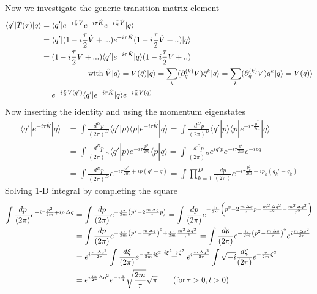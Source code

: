 \documentclass[10pt,a4paper]{article}
\theoremstyle{definition}
\begin{document}
Now we investigate the generic transition matrix element
\begin{align}
\langle q'|\hat{T}(\tau)|q\rangle
&=\langle q'|e^{-i\frac{\tau}{2}\hat{V}}e^{-i\tau\hat{K}}e^{-i\frac{\tau}{2}\hat{V}}|q\rangle\\
&=\langle q'|(1-i\frac{\tau}{2}\hat{V}+...)e^{-i\tau\hat{K}}(1-i\frac{\tau}{2}\hat{V}+..)|q\rangle\\
&=(1-i\frac{\tau}{2}V+...)\langle q'|e^{-i\tau\hat{K}}|q\rangle(1-i\frac{\tau}{2}V+..)\\
&\qquad\qquad\qquad\text{with\;} \hat{V}|q\rangle =V(\hat{q})|q\rangle=\sum_k(\partial_q^{(k)}V)\hat{q}^{k}|q\rangle=\sum_k(\partial_q^{(k)}V)q^{k}|q\rangle=V(q)\rangle\\
&=e^{-i\frac{\tau}{2}V(q')}\langle q'|e^{-i\tau\hat{K}}|q\rangle e^{-i\frac{\tau}{2}V(q)}
\end{align}
Now inserting the identity and using the momentum eigenstates
\begin{align}
\langle q'|e^{-i\tau\hat{K}}|q\rangle
&=\int \frac{d^Dp}{(2\pi)^D}\langle q'|p\rangle\langle p|e^{-i\tau\hat{K}}|q\rangle
=\int \frac{d^Dp}{(2\pi)^D}\langle q'|p\rangle\langle p|e^{-i\tau\frac{\hat{p}^2}{2m}}|q\rangle\\
&=\int \frac{d^Dp}{(2\pi)^D}\langle q'|p\rangle e^{-i\tau\frac{p^2}{2m}}\langle p|q\rangle
=\int \frac{d^Dp}{(2\pi)^D}e^{iq'p} e^{-i\tau\frac{p^2}{2m}}e^{-ipq}\\
&=\int \frac{d^Dp}{(2\pi)^D}e^{-i\tau\frac{p^2}{2m}+ip(q'-q)}
=\int \prod_{k=1}^D\frac{dp}{(2\pi)}e^{-i\tau\frac{p_k^2}{2m}+ip_k(q_k'-q_k)}
\end{align}
Solving 1-D integral by completing the square
\begin{align}
\int \frac{dp}{(2\pi)}e^{-i\tau\frac{p^2}{2m}+ip\,\Delta q}
&=\int \frac{dp}{(2\pi)}e^{-\frac{i\tau}{2m}\left(p^2-2\frac{m\,\Delta q}{\tau}p\right)}
=\int \frac{dp}{(2\pi)}e^{-\frac{i\tau}{2m}\left(p^2-2\frac{m\,\Delta q}{\tau}p+\frac{m^2\,\Delta q^2}{\tau^2}-\frac{m^2\,\Delta q^2}{\tau^2}\right)}\\
&=\int \frac{dp}{(2\pi)}e^{-\frac{i\tau}{2m}\left(p^2-\frac{m\,\Delta q}{\tau}\right)^2+\frac{i\tau}{2m}\frac{m^2\,\Delta q^2}{\tau^2}}
=\int \frac{dp}{(2\pi)}e^{-\frac{i\tau}{2m}\left(p^2-\frac{m\,\Delta q}{\tau}\right)^2}e^{i\frac{m\,\Delta q^2}{2\tau}}\\
&=e^{i\frac{m\,\Delta q^2}{2\tau}}\int \frac{d\xi}{(2\pi)}e^{-\frac{\tau}{2m}i\xi^2}
\overset{i\xi^2\rightarrow\zeta^2}{=}e^{i\frac{m\,\Delta q^2}{2\tau}}\int \sqrt{-i}\frac{d\zeta}{(2\pi)}e^{-\frac{\tau}{2m}\zeta^2}\\
&=e^{i\frac{m}{2\tau}\Delta q^2}e^{-i\frac{\pi}{4}}\sqrt{\frac{2m}{\tau}}\sqrt{\pi}\qquad(\text{for\,}\tau>0, t>0)
\end{align}
\end{document}
